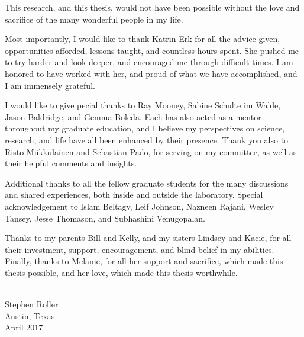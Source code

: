 %
%
%
%

This research, and this thesis, would not have been possible without the
love and sacrifice of the many wonderful people in my life.

Most importantly, I would like to thank Katrin Erk for all the advice given,
opportunities afforded, lessons taught, and countless hours spent. She pushed
me to try harder and look deeper, and encouraged me through difficult times.
I am honored to have worked with her, and proud of what we have accomplished,
and I am immensely grateful.

I would like to give pecial thanks to Ray Mooney, Sabine Schulte im Walde,
Jason Baldridge, and Gemma Boleda. Each has also acted as a mentor throughout
my graduate education, and I believe my perspectives on science, research, and
life have all been enhanced by their presence. Thank you also to
Risto Miikkulainen and Sebastian Pado, for serving on my committee, as well
as their helpful comments and insights.

Additional thanks to all the fellow graduate students for the many discussions
and shared experiences, both inside and outside the laboratory. Special
acknowledgement to Islam Beltagy, Leif Johnson, Nazneen Rajani, Wesley Tansey,
Jesse Thomason, and Subhashini Venugopalan.

Thanks to my parents Bill and Kelly, and my sisters Lindsey and Kacie, for all
their investment, support, encouragement, and blind belief in my abilities.
Finally, thanks to Melanie, for all her support and sacrifice, which made this
thesis possible, and her love, which made this thesis worthwhile.

\begin{flushright}
~\\
Stephen Roller\\
Austin, Texas\\
April 2017
\end{flushright}
